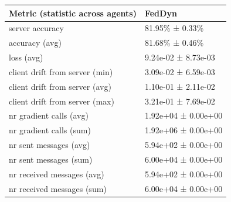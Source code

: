 \begin{tabular}{ll}
\hline
 Metric (statistic across agents)   & FedDyn              \\
\hline
 server accuracy                    & 81.95\% ± 0.33\%      \\
 accuracy (avg)                     & 81.68\% ± 0.46\%      \\
 loss (avg)                         & 9.24e-02 ± 8.73e-03 \\
 client drift from server (min)     & 3.09e-02 ± 6.59e-03 \\
 client drift from server (avg)     & 1.10e-01 ± 2.11e-02 \\
 client drift from server (max)     & 3.21e-01 ± 7.69e-02 \\
 nr gradient calls (avg)            & 1.92e+04 ± 0.00e+00 \\
 nr gradient calls (sum)            & 1.92e+06 ± 0.00e+00 \\
 nr sent messages (avg)             & 5.94e+02 ± 0.00e+00 \\
 nr sent messages (sum)             & 6.00e+04 ± 0.00e+00 \\
 nr received messages (avg)         & 5.94e+02 ± 0.00e+00 \\
 nr received messages (sum)         & 6.00e+04 ± 0.00e+00 \\
\hline
\end{tabular}
